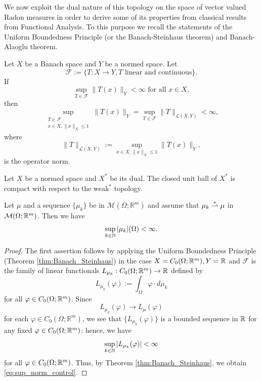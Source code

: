 We now exploit the dual nature of this topology on the space of vector valued Radon measures in order to derive some of its properties from classical results from Functional Analysis. To this purpose we recall the statements of the Uniform Boundedness Principle (or the Banach-Steinhaus theorem) and Banach-Alaoglu theorem. 

\begin{theorem} \label{thm:Banach_Steinhaus}
Let $X$ be a Banach space and $Y$ be a normed space. Let 
$$\mathcal{F} := \{ T: X \to Y, T \text{ linear and continuous}\}.$$
If $$\sup_{T \in \mathcal{F}} \|T(x)\|_{Y} < \infty \text{ for all } x \in X,$$
then
\begin{equation*} 
\sup_{\substack{T \in \mathcal{F} \\ x \in X, \|x\|_{X} \le 1}} \|T(x)\|_{Y} = \sup_{T \in \mathcal{F}} \|T\|_{\mathcal{L}(X, Y)} < \infty,
\end{equation*}
where
\begin{equation*}
\|T\|_{\mathcal{L}(X, Y)} := \sup_{x \in X, \|x\|_{X} \le 1} \|T(x)\|_{Y},
\end{equation*}
is the operator norm.
\end{theorem}

\begin{theorem} \label{thm:Banach_Alaoglu}
Let $X$ be a normed space and $X^{*}$ be its dual. The closed unit ball of $X^{*}$ is compact with respect to the weak$^{*}$ topology. 
\end{theorem}

\begin{lemma} \label{weaktopology} Let $\mu$ and a sequence $\{ \mu_{k} \}$ be in $\mathcal{M}(\Omega; \mathbb{R}^{m})$ and assume that $\mu_{k} \overset{*}{\rightharpoonup} \mu$ in $\mathcal{M}(\Omega; \mathbb{R}^{m})$. Then we have
\begin{equation} \label{eq:sup_norm_control} 
\sup_{k \in \mathbb{N}} |\mu_{k}|(\Omega) < \infty. 
\end{equation}
\end{lemma}
\begin{proof}
The first assertion follows by applying the Uniform Boundedness Principle (Theorem \ref{thm:Banach_Steinhaus}) in the case $X = C_{0}(\Omega; \mathbb{R}^{m}), Y = \mathbb{R}$ and $\mathcal{F}$ is the family of linear functionals $L_{\mu_{k}} : C_{0}(\Omega; \mathbb{R}^{m}) \to \mathbb{R}$ defined by
\begin{equation*}
L_{\mu_{k}}(\varphi) := \int_{\Omega} \varphi \cdot d \mu_{k}
\end{equation*}
for all $\varphi \in C_{0}(\Omega; \mathbb{R}^{m})$. Since $$L_{\mu_{k}}(\varphi) \to L_{\mu}(\varphi)$$ for each $\varphi \in C_{0}(\Omega; \mathbb{R}^{m})$, we see that $\{ L_{\mu_{k}}(\varphi) \}$ is a bounded sequence in $\mathbb{R}$ for any fixed $\varphi \in C_{0}(\Omega; \mathbb{R}^{m})$: hence, we have
\begin{equation*}
\sup_{k \in \mathbb{N}} |L_{\mu_{k}}(\varphi)| < \infty
\end{equation*} 
for all $\varphi \in C_{0}(\Omega; \mathbb{R}^{m})$. Thus, by Theorem \ref{thm:Banach_Steinhaus}, we obtain \eqref{eq:sup_norm_control}.
\end{proof}

